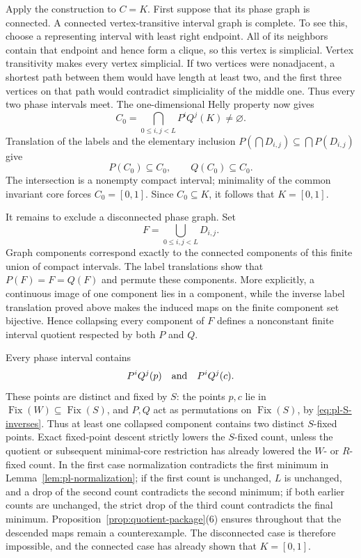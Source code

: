 \documentclass[11pt]{article}
\theoremstyle{definition}
\theoremstyle{remark}
\newcommand{\I}{[0,1]}
\newcommand{\Fix}{\operatorname{Fix}}
\begin{document}
Apply the construction to \(C=K\).  First suppose that its phase graph is
connected.  A connected vertex-transitive interval graph is complete.  To
see this, choose a representing interval with least right endpoint.  All of
its neighbors contain that endpoint and hence form a clique, so this vertex
is simplicial.  Vertex transitivity makes every vertex simplicial.  If two
vertices were nonadjacent, a shortest path between them would have length at
least two, and the first three vertices on that path would contradict
simpliciality of the middle one.  Thus every two phase intervals meet.  The
one-dimensional Helly property now gives
\[
 C_0=\bigcap_{0\leq i,j<L}P^iQ^j(K)\neq\varnothing.
\]
Translation of the labels and the elementary inclusion
\(P(\bigcap D_{i,j})\subseteq\bigcap P(D_{i,j})\) give
\[
 P(C_0)\subseteq C_0,\qquad Q(C_0)\subseteq C_0.
\]
The intersection is a nonempty compact interval; minimality of the common
invariant core forces \(C_0=\I\).  Since \(C_0\subseteq K\), it follows that
\(K=\I\).

It remains to exclude a disconnected phase graph.  Set
\[
 F=\bigcup_{0\leq i,j<L}D_{i,j}.
\]
Graph components correspond exactly to the connected components of this
finite union of compact intervals.  The label translations show that
\(P(F)=F=Q(F)\) and permute these components.  More explicitly, a continuous
image of one component lies in a component, while the inverse label
translation proved above makes the induced maps on the finite component set
bijective.  Hence collapsing every component of \(F\) defines a nonconstant
finite interval quotient respected by both \(P\) and \(Q\).

Every phase interval contains
\[
 P^iQ^j(p)\quad\hbox{and}\quad P^iQ^j(c).
\]
These points are distinct and fixed by \(S\): the points \(p,c\) lie in
\(\Fix(W)\subseteq\Fix(S)\), and \(P,Q\) act as permutations on
\(\Fix(S)\), by \eqref{eq:pl-S-inverses}.  Thus at least one collapsed
component contains two
distinct \(S\)-fixed points.  Exact fixed-point descent strictly lowers the
\(S\)-fixed count, unless the quotient or subsequent minimal-core
restriction has already lowered the \(W\)- or \(R\)-fixed count.  In the
first case normalization contradicts the first minimum in
Lemma~\ref{lem:pl-normalization}; if the first count is unchanged, \(L\) is
unchanged, and a drop of the second count contradicts the second minimum; if
both earlier counts are unchanged, the strict drop of the third count
contradicts the final minimum.  Proposition~\ref{prop:quotient-package}(6)
ensures throughout that the descended maps remain a counterexample.  The
disconnected case is therefore impossible, and the connected case has
already shown that \(K=\I\).
\end{document}
